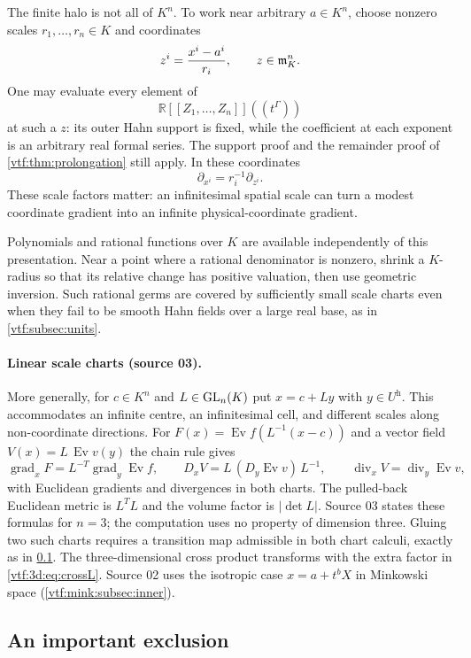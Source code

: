 \documentclass[11pt,letterpaper]{article}
\theoremstyle{definition}
\theoremstyle{remark}
\newcommand{\R}{\mathbb R}\newcommand{\C}{\mathbb C}
\newcommand{\grad}{\operatorname{grad}}\newcommand{\Div}{\operatorname{div}}
\newcommand{\ev}{\operatorname{Ev}}\newcommand{\jet}{\operatorname{J}}
\newcommand{\halo}[1]{#1^{\mathrm h}}
\newcommand{\abs}[1]{\lvert#1\rvert}\newcommand{\norm}[1]{\lVert#1\rVert}
\begin{document}
The finite halo is not all of $K^n$. To work near arbitrary $a\in K^n$, choose
nonzero scales $r_1,\ldots,r_n\in K$ and coordinates
\[
 z^i=\frac{x^i-a^i}{r_i},\qquad z\in\mathfrak m_K^n.
\]
One may evaluate every element of
\begin{equation}\label{vtf:eq:formalhahn}
 \R[[Z_1,\ldots,Z_n]]((t^\Gamma))
\end{equation}
at such a $z$: its outer Hahn support is fixed, while the coefficient at
each exponent is an arbitrary real formal series. The support proof and the
remainder proof of \cref{vtf:thm:prolongation} still apply. In these coordinates
\[
 \partial_{x^i}=r_i^{-1}\partial_{z^i}.
\]
These scale factors matter: an infinitesimal spatial scale can turn a modest
coordinate gradient into an infinite physical-coordinate gradient.

Polynomials and rational functions over $K$ are available independently of
this presentation. Near a point where a rational denominator is nonzero,
shrink a $K$-radius so that its relative change has positive valuation, then
use geometric inversion. Such rational germs are covered by sufficiently
small scale charts even when they fail to be smooth Hahn fields over a large
real base, as in \cref{vtf:subsec:units}.

\paragraph{Linear scale charts (source 03).} More generally, for $c\in K^n$ and
$L\in\operatorname{GL}_n(K)$ put $x=c+Ly$ with $y\in\halo U$. This accommodates an infinite
centre, an infinitesimal cell, and different scales along non-coordinate
directions. For $F(x)=\ev f(L^{-1}(x-c))$ and a vector field $V(x)=L\,\ev v(y)$
the chain rule gives
\[
 \grad_xF=L^{-T}\grad_y\ev f,\qquad
 D_xV=L\,(D_y\ev v)\,L^{-1},\qquad
 \Div_xV=\Div_y\ev v,
\]
with Euclidean gradients and divergences in both charts. The pulled-back
Euclidean metric is $L^TL$ and the volume factor is $\abs{\det L}$. Source 03
states these formulas for $n=3$; the computation uses no property of dimension
three. Gluing two such charts requires a transition map admissible in both chart
calculi, exactly as in \cref{vtf:subsec:exclusion}. The three-dimensional cross
product transforms with the extra factor in \eqref{vtf:3d:eq:crossL}. Source 02
uses the isotropic case $x=a+t^bX$ in Minkowski space
(\cref{vtf:mink:subsec:inner}).

\subsection{An important exclusion}\label{vtf:subsec:exclusion}
\end{document}
